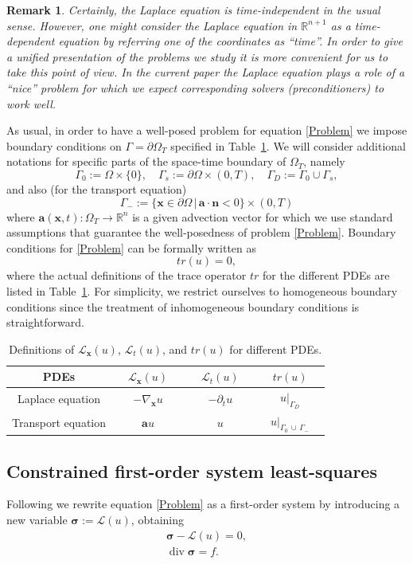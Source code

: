 \documentclass[a4paper,12pt]{amsart}
\numberwithin{equation}{section}
\newtheorem{remark}{Remark}[section]
\renewcommand{\div}{\operatorname{div}}
\def\bu{{\mathbf a}} %
\def\bn{{\mathbf n}}
\renewcommand{\L}{{\mathcal L}}
\def\XVec#1{{\mathbf #1}}
\def\Xx{\XVec{x}}
\def\bsigma{{\boldsymbol \sigma}}
\begin{document}
\begin{remark}
Certainly, the Laplace equation is time-independent in the usual sense. However, one might consider the Laplace equation in $\mathbb{R}^{n+1}$ as a time-dependent equation by referring one of the coordinates as ``time''. In order to give a unified presentation of the problems we study it is more convenient for us to take this point of view. In the current paper the Laplace equation plays a role of a ``nice'' problem for which we expect corresponding solvers (preconditioners) to work well.
\end{remark}

As usual, in order to have a well-posed problem for equation \eqref{Problem} we impose boundary conditions on $\Gamma = \partial \Omega_T$ specified in Table~\ref{tab:PDE_operators}. We will consider additional notations for specific parts of the space-time boundary of $\Omega_T$, namely 
\[
\Gamma_0 := \Omega\times\{0\},\quad\Gamma_s := \partial\Omega\times(0, T),\quad\Gamma_D := \Gamma_0\cup\Gamma_s,
\]
and also (for the transport equation)
\[
\Gamma_- := \{\Xx\in\partial\Omega \,|\, \bu\cdot\bn < 0 \}\times(0, T)
\]
where $\bu(\Xx,t) : \Omega_T \rightarrow \mathbb{R}^n$ is a given advection vector for which we use standard assumptions that guarantee the well-posedness \cite{evans} of problem \eqref{Problem}. Boundary conditions for  \eqref{Problem} can be formally written as
\[
tr (u) = 0,
\]
where the actual definitions of the trace operator $tr$ for the different PDEs are listed in Table~\ref{tab:PDE_operators}. For simplicity, we restrict ourselves to homogeneous boundary conditions since the treatment of inhomogeneous boundary conditions is straightforward. 
\begin{table}[h]
\caption{Definitions of $\L_\Xx(u)$, $\L_t(u)$, and $tr(u)$ for different PDEs.}
\label{tab:PDE_operators}
\begin{tabular}{ |c||c|c|c|} \hline
PDEs & $\quad \L_\Xx(u) \quad$ & $\quad \L_t(u) \quad$ & $\quad tr(u) \quad$  \\ \hline
Laplace equation & $-\nabla_\Xx u$ & $-\partial_t u$ & $u|_{\Gamma_D}$ \\ \hline
Transport equation & $\bu u$ & $u$ & $u|_{\Gamma_0\,\cup\,\Gamma_-}$   \\ \hline
\end{tabular}
\end{table}

\subsection{Constrained first-order system least-squares} 
Following \cite{neumueller_vassilevski_villa} we rewrite equation \eqref{Problem} as a first-order system by introducing a new variable $\bsigma := \L(u)$, 
obtaining 
\begin{equation}
\begin{array}{c}
\bsigma - \L(u)  = 0,  \\ 
\div \bsigma = f. 
\end{array}
\label{eq:fos} 
\end{equation}
\end{document}
